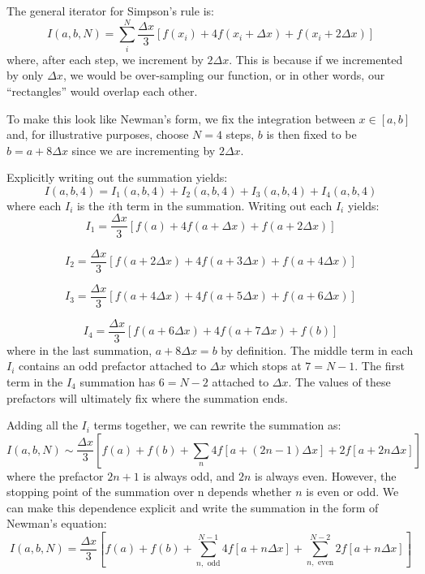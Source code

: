 \documentclass[12pt]{article}
\begin{document}
The general iterator for Simpson's rule is:	
$$ I(a,b,N) = \sum_i^N \frac{\Delta x}{3} \left[  f(x_i) + 4f(x_i+\Delta x) + f(x_i+2\Delta x) \right] $$
where, after each step, we increment by $2\Delta x$. This is because if we incremented by only $\Delta x$, we would be over-sampling our function, or in other words, our ``rectangles'' would overlap each other.

To make this look like Newman's form, we fix the integration between $x\in [a,b]$ and, for illustrative purposes, choose $N=4$ steps, $b$ is then fixed to be $b=a+8\Delta x$ since we are incrementing by $2\Delta x$.

Explicitly writing out the summation yields:
$$ I(a,b,4) = I_1(a,b,4) + I_2(a,b,4) + I_3(a,b,4) + I_4 (a,b,4) $$ where each $I_i$ is the $i\text{th}$ term in the summation. Writing out each $I_i$ yields:
$$I_1= \frac{\Delta x}{3} \left[  f(a) + 4f(a+\Delta x) + f(a+2\Delta x) \right]$$

$$I_2= \frac{\Delta x}{3} \left[  f(a+2\Delta x) + 4f(a+3\Delta x) + f(a+4\Delta x) \right] $$

$$I_3= \frac{\Delta x}{3} \left[  f(a+4\Delta x) + 4f(a+5\Delta x) + f(a+6\Delta x) \right] $$

$$I_4= \frac{\Delta x}{3} \left[  f(a+6\Delta x) + 4f(a+7\Delta x) + f(b) \right] $$
where in the last summation, $a+8\Delta x = b$ by definition. The middle term in each $I_i$ contains an odd prefactor attached to $\Delta x$ which stops at $7 = N-1$. The first term in the $I_4$ summation has $6=N-2$ attached to $\Delta x$. The values of these prefactors will ultimately fix where the summation ends.

Adding all the $I_i$ terms together, we can rewrite the summation as:
$$ I(a,b,N) \sim \frac{\Delta x}{3} \left[ f(a) + f(b) + \sum_n 4 f[a+(2n-1)\Delta x] + 2f[a+2n\Delta x] \right] $$
where the prefactor $2n+1$ is always odd, and $2n$ is always even. However, the stopping point of the summation over n depends whether $n$ is even or odd. We can make this dependence explicit and write the summation in the form of Newman's equation:
$$ I(a,b,N) = \frac{\Delta x}{3} \left[ f(a) + f(b) + \sum_{n,\text{ odd}}^{N-1} 4 f[a+n\Delta x] + \sum_{n,\text{ even}}^{N-2} 2f[a+n\Delta x] \right] $$

	
	
	
\end{document}
